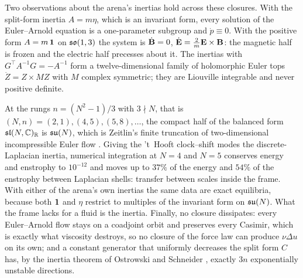 Two observations about the arena's inertias hold across these closures. With the split-form inertia $A=m\eta$, which is an invariant form, every
solution of the Euler--Arnold equation is a one-parameter subgroup and $\dot p\equiv0$. With the positive form $A=m\,\mathbf 1$ on $\mathfrak{so}(1,3)$ the system is
$\dot{\mathbf B}=0$, $\dot{\mathbf E}=\tfrac2m\mathbf E\times\mathbf B$: the magnetic half is frozen and the electric half precesses about it. The inertias with
$G^{\!\top}A^{-1}G=-A^{-1}$ form a twelve-dimensional family of holomorphic Euler tops $\dot Z=Z\times MZ$ with $M$ complex symmetric; they are Liouville
integrable and never positive definite.

At the rungs $n=(N^2-1)/3$ with $3\nmid N$, that is $(N,n)=(2,1),(4,5),(5,8),\dots$, the compact half of the balanced form $\mathfrak{sl}(N,\mathbb{C})_{\mathbb{R}}$ is $\mathfrak{su}(N)$,
which is Zeitlin's finite truncation of two-dimensional incompressible Euler flow \cite{Zeitlin91}. Giving the 't~Hooft clock--shift modes the
discrete-Laplacian inertia, numerical integration at $N=4$ and $N=5$ conserves energy and enstrophy to $10^{-12}$ and moves up to $37\%$ of the
energy and $54\%$ of the enstrophy between Laplacian shells: transfer between scales inside the frame. With either of the arena's own inertias the same
data are exact equilibria, because both $\mathbf 1$ and $\eta$ restrict to multiples of the invariant form on $\mathfrak{su}(N)$. What the frame lacks for a fluid is
the inertia. Finally, no closure dissipates: every Euler--Arnold flow stays on a coadjoint orbit and preserves every Casimir, which is exactly what
viscosity destroys, so no closure of the force law can produce $\nu\Delta u$ on its own; and a constant generator that uniformly decreases the split
form $C$ has, by the inertia theorem of Ostrowski and Schneider \cite{OstrowskiSchneider62}, exactly $3n$ exponentially unstable directions.
